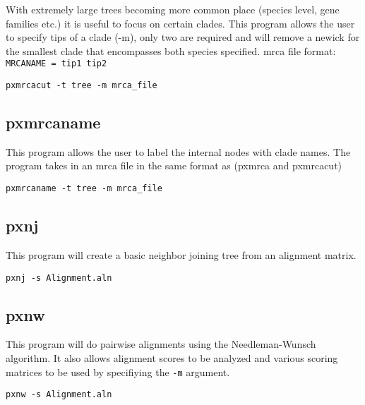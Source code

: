 \documentclass[12pt,letterpaper]{memoir}
\begin{document}
With extremely large trees becoming more common place (species level, gene families etc.) it is useful to focus on certain clades. This program allows the user to specify tips of a clade (-m), only two are required and will remove a newick for the smallest clade that encompasses both species specified. mrca file format:
\texttt{MRCANAME = tip1 tip2}

\begin{flushleft}
\begin{verbatim}
pxmrcacut -t tree -m mrca_file
\end{verbatim}
\end{flushleft}

\subsection{pxmrcaname}

This program allows the user to label the internal nodes with clade names. The program takes in an mrca file in the same format as (pxmrca and pxmrcacut)

\begin{flushleft}
\begin{verbatim}
pxmrcaname -t tree -m mrca_file
\end{verbatim}
\end{flushleft}

\subsection{pxnj}

This program will create a basic neighbor joining tree from an alignment matrix.

\begin{flushleft}
\begin{verbatim}
pxnj -s Alignment.aln
\end{verbatim}
\end{flushleft}

\subsection{pxnw}

This program will do pairwise alignments using the Needleman-Wunsch algorithm. It also allows alignment scores to be analyzed and various scoring matrices to be used by specifiying the \texttt{-m} argument.

\begin{flushleft}
\begin{verbatim}
pxnw -s Alignment.aln
\end{verbatim}
\end{flushleft}
\end{document}
